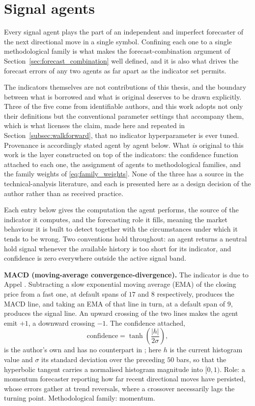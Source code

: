 \section{Signal agents}\label{sec:agents}

Every signal agent plays the part of an independent and imperfect forecaster of the next directional move in a single symbol. Confining each one to a single methodological family is what makes the forecast-combination argument of Section~\ref{sec:forecast_combination} well defined, and it is also what drives the forecast errors of any two agents as far apart as the indicator set permits.

The indicators themselves are not contributions of this thesis, and the boundary between what is borrowed and what is original deserves to be drawn explicitly. Three of the five come from identifiable authors, and this work adopts not only their definitions but the conventional parameter settings that accompany them, which is what licenses the claim, made here and repeated in Section~\ref{subsec:walkforward}, that no indicator hyperparameter is ever tuned. Provenance is accordingly stated agent by agent below. What \emph{is} original to this work is the layer constructed on top of the indicators: the confidence function attached to each one, the assignment of agents to methodological families, and the family weights of \eqref{eq:family_weights}. None of the three has a source in the technical-analysis literature, and each is presented here as a design decision of the author rather than as received practice.

Each entry below gives the computation the agent performs, the source of the indicator it computes, and the forecasting role it fills, meaning the market behaviour it is built to detect together with the circumstances under which it tends to be wrong. Two conventions hold throughout: an agent returns a neutral hold signal whenever the available history is too short for its indicator, and confidence is zero everywhere outside the active signal band.

\textbf{MACD (moving-average convergence-divergence).} The indicator is due to Appel \cite{appel2005}. Subtracting a slow exponential moving average (EMA) of the closing price from a fast one, at default spans of $17$ and $8$ respectively, produces the MACD line, and taking an EMA of that line in turn, at a default span of $9$, produces the signal line. An upward crossing of the two lines makes the agent emit $+1$, a downward crossing $-1$. The confidence attached,
\begin{equation}
\mathrm{confidence} = \tanh\!\left(\frac{|h|}{2\sigma}\right),
\label{eq:macd_confidence}
\end{equation}
is the author's own and has no counterpart in \cite{appel2005}; here $h$ is the current histogram value and $\sigma$ its standard deviation over the preceding $50$ bars, so that the hyperbolic tangent carries a normalised histogram magnitude into $[0, 1)$. Role: a momentum forecaster reporting how far recent directional moves have persisted, whose errors gather at trend reversals, where a crossover necessarily lags the turning point. Methodological family: momentum.

